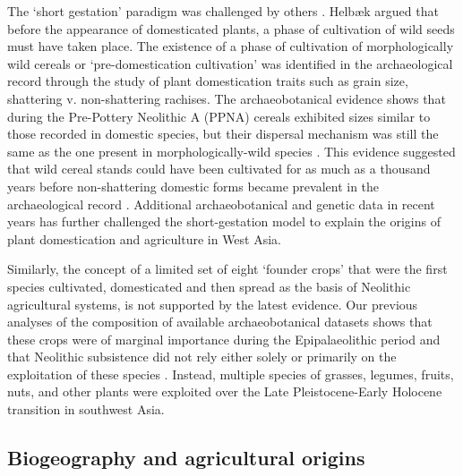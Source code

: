 \documentclass[
  authoryear,
  preprint]{elsarticle}
\begin{document}
The `short gestation' paradigm was challenged by others
\citep{Helbaek1969, Harris1989, Kislev1989, Colledge2001, WeissEtAl2004, WillcoxEtAl2008, FullerEtAl2018}.
Helbæk \citep[in][]{Kirkbride1966} argued that before the appearance of
domesticated plants, a phase of cultivation of wild seeds must have
taken place. The existence of a phase of cultivation of morphologically
wild cereals or `pre-domestication cultivation' was identified in the
archaeological record through the study of plant domestication traits
such as grain size, shattering v. non-shattering rachises. The
archaeobotanical evidence shows that during the Pre-Pottery Neolithic A
(PPNA) cereals exhibited sizes similar to those recorded in domestic
species, but their dispersal mechanism was still the same as the one
present in morphologically-wild species \citep[i.e.~shattering,
see][]{Kirkbride1966, Kislev1989, HillmanEtAl2001, Colledge2001, WillcoxEtAl2008}.
This evidence suggested that wild cereal stands could have been
cultivated for as much as a thousand years before non-shattering
domestic forms became prevalent in the archaeological record
\citep{TannoWillcox2006, TannoWillcox2012, ArranzOtaeguiEtAl2016}.
Additional archaeobotanical
\citep{Colledge2001, WillcoxEtAl2008, WillcoxEtAl2009, RiehlEtAl2013, ArranzOtaeguiEtAl2016, WeideEtAl2018, DoucheWillcox2018, WhitlamEtAl2018}
and genetic data
\citep{BadrEtAl2000, MolinaCanoEtAl2005, KilianEtAl2007, OzkanEtAl2011, IobBotigue2023}
in recent years has further challenged the short-gestation model to
explain the origins of plant domestication and agriculture in West Asia.

Similarly, the concept of a limited set of eight `founder crops'
\citep{ZoharyHopf1988} that were the first species cultivated,
domesticated and then spread as the basis of Neolithic agricultural
systems, is not supported by the latest evidence. Our previous analyses
of the composition of available archaeobotanical datasets shows that
these crops were of marginal importance during the Epipalaeolithic
period \citep{ArranzOtaeguiEtAl2018} and that Neolithic subsistence did
not rely either solely or primarily on the exploitation of these species
\citep{ArranzOtaeguiRoe2023}. Instead, multiple species of grasses,
legumes, fruits, nuts, and other plants were exploited over the Late
Pleistocene-Early Holocene transition in southwest Asia.

\subsection{Biogeography and agricultural
origins}\label{biogeography-and-agricultural-origins}
\end{document}
